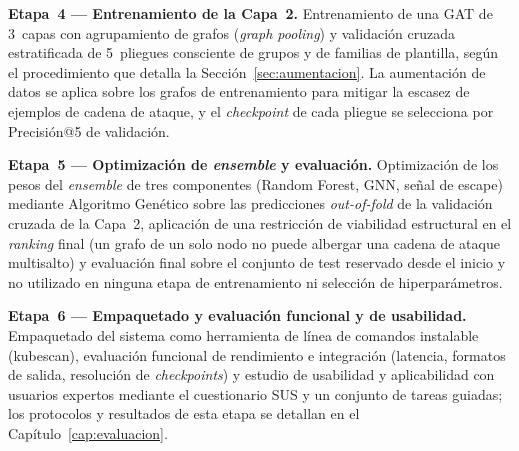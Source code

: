 \textbf{Etapa~4 — Entrenamiento de la Capa~2.} Entrenamiento de una \ac{GAT} de 3~capas
con agrupamiento de grafos (\textit{graph pooling}) y validación cruzada estratificada
de 5~pliegues consciente de grupos y de familias de plantilla, según el
procedimiento que detalla la Sección~\ref{sec:aumentacion}. La aumentación de datos se aplica sobre
los grafos de entrenamiento para mitigar la escasez de ejemplos de cadena de
ataque, y el \textit{checkpoint} de cada pliegue se selecciona por Precisión@5 de
validación.

\textbf{Etapa~5 — Optimización de \textit{ensemble} y evaluación.} Optimización de los pesos
del \textit{ensemble} de tres componentes (Random Forest, \ac{GNN}, señal de escape) mediante
Algoritmo Genético sobre las predicciones \textit{out-of-fold} de la validación
cruzada de la Capa~2, aplicación de una restricción de viabilidad estructural en el
\textit{ranking} final (un grafo de un solo nodo no puede albergar una cadena de
ataque multisalto) y evaluación final sobre el conjunto de test reservado desde
el inicio y no utilizado en ninguna etapa de entrenamiento ni selección de
hiperparámetros.

\textbf{Etapa~6 — Empaquetado y evaluación funcional y de usabilidad.} Empaquetado del
sistema como herramienta de línea de comandos instalable (kubescan),
evaluación funcional de rendimiento e integración (latencia, formatos de salida,
resolución de \textit{checkpoints}) y estudio de usabilidad y aplicabilidad con
usuarios expertos mediante el cuestionario \ac{SUS} y un conjunto de tareas guiadas;
los protocolos y resultados de esta etapa se detallan en el Capítulo~\ref{cap:evaluacion}.
